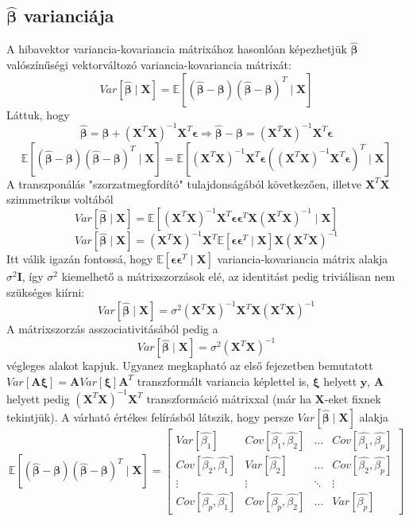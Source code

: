 \documentclass[14p]{report}
\def\pmb{\boldsymbol}
\def\ebeta{\hat{\pmb{\beta}}}
\def\e{\epsilon}
\newcounter{x}
\newcounter{y}
\newcounter{z}
\begin{document}
	\subsection{$\ebeta$ varianciája}
	A hibavektor variancia-kovariancia mátrixához hasonlóan képezhetjük $\ebeta$ valószínűségi vektorváltozó variancia-kovariancia mátrixát:
	\[
	Var[\ebeta \mid \pmb{X}] = \mathbb{E}[(\ebeta - \pmb{\beta})(\ebeta - \pmb{\beta})^T \mid \pmb{X}]
	\]
	Láttuk, hogy
	\[
	\ebeta = \pmb{\beta} + (\pmb{X}^T\pmb{X})^{-1}\pmb{X}^T\pmb{\e} \Longrightarrow \ebeta - \pmb{\beta} = (\pmb{X}^T\pmb{X})^{-1}\pmb{X}^T\pmb{\e}
	\]
	\[
	\mathbb{E}[(\ebeta - \pmb{\beta})(\ebeta - \pmb{\beta})^T \mid \pmb{X}] = 
	\mathbb{E}\left[
	(\pmb{X}^T\pmb{X})^{-1}\pmb{X}^T\pmb{\e}((\pmb{X}^T\pmb{X})^{-1}\pmb{X}^T\pmb{\e})^T \mid \pmb{X}
	\right]
	\]
	A transzponálás "szorzatmegfordító" tulajdonságából következően, illetve $\pmb{X}^T\pmb{X}$ szimmetrikus voltából
	\[
	Var[\ebeta \mid \pmb{X}] = 
	\mathbb{E}\left[
	(\pmb{X}^T\pmb{X})^{-1}\pmb{X}^T\pmb{\e}\pmb{\e}^T\pmb{X}(\pmb{X}^T\pmb{X})^{-1} \mid \pmb{X}
	\right]
	\]
	\[
	Var[\ebeta \mid \pmb{X}] = (\pmb{X}^T\pmb{X})^{-1}\pmb{X}^T\mathbb{E}[\pmb{\e}\pmb{\e}^T \mid \pmb{X}]\pmb{X}(\pmb{X}^T\pmb{X})^{-1}
	\]
	Itt válik igazán fontossá, hogy $\mathbb{E}[\pmb{\e}\pmb{\e}^T \mid \pmb{X}]$ variancia-kovariancia mátrix alakja $\sigma^2\pmb{I}$, így $\sigma^2$ kiemelhető a mátrixszorzások elé, az identitást pedig triviálisan nem szükséges kiírni:
	\[
	Var[\ebeta \mid \pmb{X}] = \sigma^2(\pmb{X}^T\pmb{X})^{-1}\pmb{X}^T\pmb{X}(\pmb{X}^T\pmb{X})^{-1}
	\]
	A mátrixszorzás asszociativitásából pedig a
	\[
	Var[\ebeta \mid \pmb{X}] = \sigma^2(\pmb{X}^T\pmb{X})^{-1}
	\]
	végleges alakot kapjuk. Ugyanez megkapható az első fejezetben bemutatott $Var[\pmb{A}\pmb{\xi}] = \pmb{A}Var[\pmb{\xi}]\pmb{A}^T$ transzformált variancia képlettel is, $\pmb{\xi}$ helyett $\pmb{y}$, $\pmb{A}$ helyett pedig $(\pmb{X}^T\pmb{X})^{-1}\pmb{X}^T$ transzformáció mátrixxal (már ha $\pmb{X}$-eket fixnek tekintjük). A várható értékes felírásból látszik, hogy persze $Var[\ebeta \mid \pmb{X}]$ alakja
	\[
	\mathbb{E}[(\ebeta - \pmb{\beta})(\ebeta - \pmb{\beta})^T \mid \pmb{X}] =
	\begin{bmatrix}
		Var[\hat{\beta_1}] & Cov[\hat{\beta_1},\hat{\beta_2}] & \dots & Cov[\hat{\beta_1},\hat{\beta_p}] \\
		Cov[\hat{\beta_2},\hat{\beta_1}] & Var[\hat{\beta_2}] & \dots & Cov[\hat{\beta_2},\hat{\beta_p}] \\
		\vdots & \vdots & \ddots & \vdots \\
		Cov[\hat{\beta_p},\hat{\beta_1}] & Cov[\hat{\beta_p},\hat{\beta_2}] & \dots & Var[\hat{\beta_p}]
	\end{bmatrix}
	\]
\end{document}
